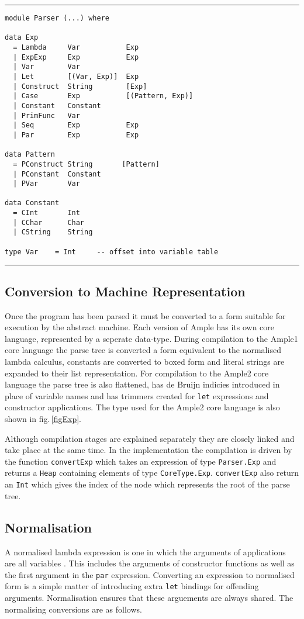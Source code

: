 \hrule
\bigskip
\begin{verbatim}
module Parser (...) where

data Exp
  = Lambda     Var           Exp
  | ExpExp     Exp           Exp
  | Var        Var
  | Let        [(Var, Exp)]  Exp
  | Construct  String        [Exp]
  | Case       Exp           [(Pattern, Exp)]
  | Constant   Constant
  | PrimFunc   Var
  | Seq        Exp           Exp
  | Par        Exp           Exp
 
data Pattern
  = PConstruct String       [Pattern]
  | PConstant  Constant
  | PVar       Var
  
data Constant
  = CInt       Int
  | CChar      Char
  | CString    String

type Var    = Int     -- offset into variable table
\end{verbatim}
\hrule


\subsection{Conversion to Machine Representation}
Once the program has been parsed it must be converted to a form suitable for execution by the abstract machine. Each version of Ample has its own core language, represented by a seperate data-type. During compilation to the Ample1 core language the parse tree is converted a form equivalent to the normalised lambda calculus, constants are converted to boxed form and literal strings are expanded to their list representation. For compilation to the Ample2 core language the parse tree is also flattened, has de Bruijn indicies introduced in place of variable names and has trimmers created for \texttt{let} expressions and constructor applications. The type used for the Ample2 core language is also shown in fig.\,\ref{figExp}.

Although compilation stages are explained separately they are closely linked and take place at the same time. In the implementation the compilation is driven by the function \texttt{convertExp} which takes an expression of type \texttt{Parser.Exp} and returns a \texttt{Heap} containing elements of type \texttt{CoreType.Exp}. \texttt{convertExp} also return an \texttt{Int} which gives the index of the node which represents the root of the parse tree. 

\subsection{Normalisation}
A normalised lambda expression is one in which the arguments of applications are all variables \cite{sestoft}. This includes the arguments of constructor functions as well as the first argument in the \texttt{par} expression. Converting an expression to normalised form is a simple matter of introducing extra \texttt{let} bindings for offending arguments. Normalisation ensures that these arguements are always shared. The normalising conversions are as follows.


